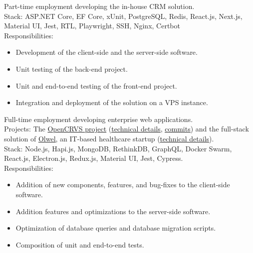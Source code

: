 \documentclass[10pt,a4paper,ragged2e]{altacv}
\begin{document}
\small Part-time employment developing the in-house CRM solution.\\
\smallskip
Stack: ASP.NET Core, EF Core, xUnit, PostgreSQL, Redis, React.js, Next.js, Material UI, Jest, RTL, Playwright, SSH, Nginx, Certbot\\
\smallskip
Responsibilities:
\begin{itemize}
\item Development of the client-side and the server-side software.
\item Unit testing of the back-end project.
\item Unit and end-to-end testing of the front-end project.
\item Integration and deployment of the solution on a VPS instance.
\end{itemize}

\medskip

\small Full-time employment developing enterprise web applications.\\
\smallskip
\small Projects: The \href{https://www.dsinnovators.com/projects/open-crvs}{OpenCRVS project} (\href{https://www.dsinnovators.com/casestudies/open-crvs-2}{\underline{technical details}}, \href{https://github.com/opencrvs/opencrvs-core/commits?author=maacpiash}{\underline{commits}}) and the full-stack solution of \href{https://www.dsinnovators.com/projects/olwel}{\underline{Olwel}}, an IT-based healthcare startup (\href{https://www.dsinnovators.com/casestudies/olwel-2}{\underline{technical details}}).\\
\smallskip
Stack: Node.js, Hapi.js, MongoDB, RethinkDB, GraphQL, Docker Swarm, React.js, Electron.js, Redux.js, Material UI, Jest, Cypress.\\
\smallskip
Responsibilities:
\begin{itemize}
\item Addition of new components, features, and bug-fixes to the client-side software.
\item Addition features and optimizations to the server-side software.
\item Optimization of database queries and database migration scripts.
\item Composition of unit and end-to-end tests.
\end{itemize}
\end{document}
